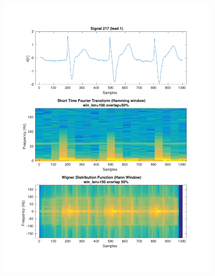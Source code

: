 \documentclass[11pt,a4paper]{article}
\begin{document}
\begin{figure}[H]
\centering
\begin{minipage}{0.48\textwidth}
	\centering
	\includegraphics[width=\textwidth]{fig/217l1_stft_wdf.pdf}
\end{minipage}
\begin{minipage}{0.48\textwidth}
	\centering

\end{minipage}
\end{figure}
\end{document}
